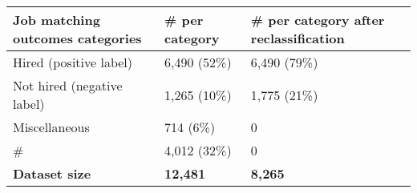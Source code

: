 
\begin{tabular}{lll}
\toprule
\textbf{Job matching outcomes categories}    &  \textbf{\# per category}  & \textbf{\# per category after reclassification}\\
\midrule
Hired (positive label)              & 6,490 (52\%)      & 6,490 (79\%)                          \\
Not hired (negative label)          & 1,265 (10\%)      & 1,775 (21\%)                          \\
Miscellaneous                       & 714 (6\%)         & 0                                     \\
\#                                  & 4,012 (32\%)      & 0                                     \\
\midrule
\textbf{Dataset size}               & \textbf{12,481}   & \textbf{8,265}                        \\
\bottomrule
\end{tabular}

